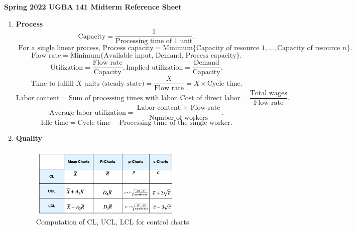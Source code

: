 \documentclass[twoside, 12pt]{article}
\newcommand{\lecture}[4]{
}
\begin{document}



\begin{center}
	{\bf \large Spring 2022 UGBA 141 Midterm Reference Sheet}
\end{center}

\begin{enumerate}

\item {\bf Process}
	\[
	\text{Capacity} = \frac{1}{\text{Processing time of $1$ unit}}.
	\]
	\[
\text{ For a single linear process, }	\text{Process capacity} = \text{Minimum} \{ \text{Capacity of resource } 1, \dots, \text{Capacity of resource } n \}.
	\]
	\[
	\text{Flow rate} = \text{Minimum} \{ \text{Available input, Demand, Process capacity} \}.
	\]
		\[
		\text{Utilization} = \frac{\text{Flow rate}}{\text{Capacity}}, 	\text{Implied utilization} = \frac{\text{Demand}}{\text{Capacity}}.
		\]
		\[
		\text{Time to fulfill $X$ units (steady state)} = \frac{X}{\text{Flow rate}} = X \times \text{Cycle time}.
		\]
			\[
		\text{Labor content} = \text{Sum of processing times with labor}, 	\text{Cost of direct labor} = \frac{\text{Total wages}}{\text{Flow rate}}.
		\]
		\[
		\text{Average labor utilization}  = \frac{\text{Labor content $\times$ Flow rate}}{\text{Number of workers}}.
		\]
		\[
		\text{Idle time} = \text{Cycle time} - \text{Processing time of the single worker}.
		\]
		


\item {\bf Quality}
\begin{figure}[!htbp]
		\centering
		\includegraphics[width = 0.7\textwidth]{control_chart_screenshot}
		\caption{Computation of CL, UCL, LCL for control charts}
	\end{figure}


\end{enumerate}
\end{document}
